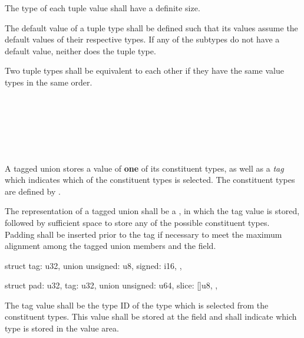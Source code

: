 \specsubsubitem
The type of each tuple value shall have a definite size.

\specsubsubitem
The default value of a tuple type shall be defined such that its values assume
the default values of their respective types. If any of the subtypes do not
have a default value, neither does the tuple type.

\specsubsubitem
Two tuple types shall be equivalent to each other if they have the same value
types in the same order.


\begin{grammar}
 \\
	\terminal{(}  \terminal{)} \\

 \\
	 \terminal{|}  \optional{\terminal{|}}\\
	 \terminal{|}  \\
\end{grammar}

\specsubsubitem
A tagged union stores a value of \textbf{one} of its constituent types, as well
as a \textit{tag} which indicates which of the constituent types is selected.
The constituent types are defined by .

\specsubsubitem
The representation of a tagged union shall be a , in which the
tag value is stored, followed by sufficient space to store any of the possible
constituent types. Padding shall be inserted prior to the tag if necessary to
meet the maximum alignment among the tagged union members and the 
field.


\begin{codesample}
struct {
	tag: u32,
	union {
		unsigned: u8,
		signed: i16,
	},
}
\end{codesample}
\begin{codesample}
struct {
	pad: u32,
	tag: u32,
	union {
		unsigned: u64,
		slice: []u8,
	},
}
\end{codesample}

\specsubsubitem
The tag value shall be the type ID of the type which is selected from the
constituent types. This value shall be stored at the  field and
shall indicate which type is stored in the value area.

